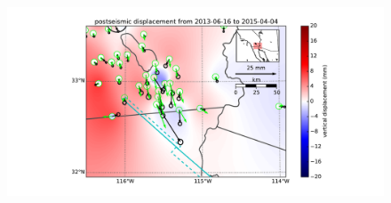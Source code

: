 \documentclass[12pt]{article}
\begin{document}
\begin{figure}
\includegraphics[scale=0.6]{Figures/near_field_data_4}
\centering 
\caption{}
\label{nearfield4}
\end{figure}
\end{document}
